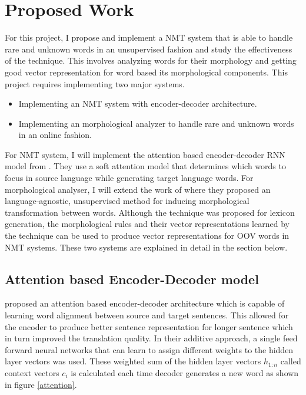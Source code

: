 \section{Proposed Work }
For this project, I propose and implement a NMT system that is able to handle rare and unknown words in an unsupervised fashion and study the effectiveness of the technique. This involves analyzing words for their morphology and getting good vector representation for word based its morphological components. This project requires implementing two major systems.

\begin{itemize}
	\item Implementing an NMT system with encoder-decoder architecture.
	\item Implementing an morphological analyzer to handle rare and unknown words in an online fashion.
\end{itemize}


For NMT system, I will implement the attention based encoder-decoder RNN model from \cite{bahdanau2014neural}. They use a soft attention model that determines which words to focus in source language while generating target language words. For morphological analyser, I will extend the work of \cite{soricut2015unsupervised} where they proposed an language-agnostic, unsupervised method for inducing morphological transformation between words. Although the technique was proposed for lexicon generation, the morphological rules and their vector representations learned by the technique can be used to produce vector representations for OOV words in NMT systems. These two systems are explained in detail in the section below.




\subsection{Attention based Encoder-Decoder model}

\cite{bahdanau2014neural} proposed an attention based encoder-decoder architecture which is capable of learning word alignment between source and target sentences. This allowed for the encoder to produce better sentence representation for longer sentence which in turn improved the translation quality. In their additive approach, a single feed forward neural networks that can learn to assign different weights to the hidden layer vectors was used. These weighted sum of the hidden layer vectors $h_{1:n}$ called context vectors $c_i$ is calculated each time decoder generates a new word as shown in figure \ref{attention}.


